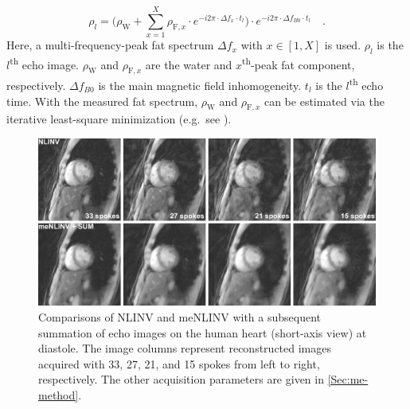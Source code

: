 \begin{equation}
  \rho_l = \Big( \rho_\text{W} + \sum_{x=1}^{X} \rho_{\text{F},x} \cdot e^{-i 2\pi \cdot \Delta f_x \cdot t_l} \Big) \cdot e^{-i 2\pi \cdot \Delta f_{B0} \cdot t_l} \quad .
\end{equation}
Here, a multi-frequency-peak fat spectrum $\Delta f_x$ with $x \in [1,X]$ is used. $\rho_l$ is the $l$\textsuperscript{th} echo image. $\rho_\text{W}$ and $\rho_{\text{F},x}$ are the water and $x$\textsuperscript{th}-peak fat component, respectively. $\Delta f_{B0}$ is the main magnetic field inhomogeneity. $t_l$ is the $l$\textsuperscript{th} echo time. With the measured fat spectrum, $\rho_\text{W}$ and $\rho_{\text{F},x}$ can be estimated via the iterative least-square minimization (e.g.~see \cite{2004_IDEAL,2008_water_fat}).

\begin{figure}[tb]
  \centering
  \includegraphics[width=\textwidth]{fig/multi-echo-cardiac-reco-comp.png}
  \caption{Comparisons of NLINV and meNLINV with a subsequent summation of echo images on the human heart (short-axis view) at diastole. The image columns represent reconstructed images acquired with \num{33}, \num{27}, \num{21}, and \num{15} spokes from left to right, respectively. The other acquisition parameters are given in \cref{Sec:me-method}.} \label{Fig:multi-echo-cardiac-reco-comp}
\end{figure}
